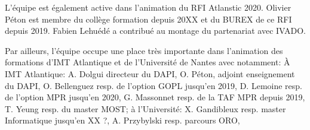 L'équipe est également active dans l'animation du RFI Atlanstic 2020. Olivier Péton est membre du collège formation depuis 20XX et du BUREX de ce RFI depuis 2019. Fabien Lehuédé a contribué au montage du partenariat avec IVADO. 

Par ailleurs, l'équipe occupe une place très importante dans l'animation des formations d'IMT Atlantique et de l'Université de Nantes avec notamment: 
\`A IMT Atlantique: A. Dolgui directeur du DAPI, O. Péton, adjoint enseignement du DAPI, O. Bellenguez resp. de l'option GOPL jusqu'en 2019, D. Lemoine resp. de l'option MPR jusqu'en 2020, G. Massonnet resp. de la TAF MPR depuis 2019, T. Yeung resp. du master MOST;
à l'Université: 
X. Gandibleux resp. master Informatique jusqu'en XX ?, 
A. Przybylski resp. parcours ORO, 



